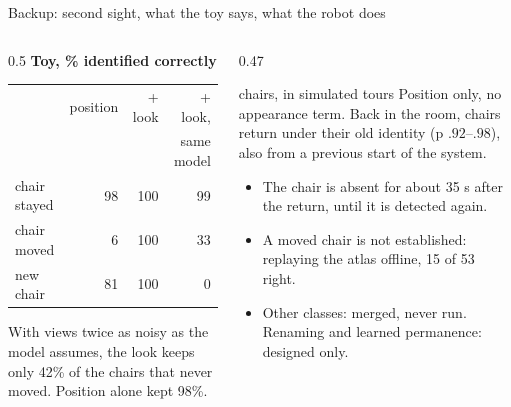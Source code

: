 \documentclass[10pt, aspectratio=169]{beamer}
\begin{document}
\begin{frame}{Backup: second sight, what the toy says, what the robot does \wip}
  \begin{columns}[T]
    \begin{column}{0.5\textwidth}
      \footnotesize
      \textbf{Toy, \% identified correctly}\\[0.3em]
      \begin{tabular}{@{}l r r r@{}}
        \toprule
         & position & + look & + look,\\
         & & & same model \\
        \midrule
        chair stayed & 98 & 100 & 99 \\
        chair moved & 6 & 100 & \alert{33} \\
        new chair & 81 & 100 & \alert{0} \\
        \bottomrule
      \end{tabular}

      \vspace{0.6em}
      With views twice as noisy as the model assumes, the look keeps only \alert{42\%} of the chairs
      that never moved. Position alone kept 98\%.
    \end{column}
    \begin{column}{0.47\textwidth}
      \begin{measured}{chairs, in simulated tours}\footnotesize
        Position only, no appearance term. Back in the room, chairs return under their old identity
        (p $.92$--$.98$), also from a previous start of the system.
      \end{measured}
      \footnotesize
      \begin{itemize}
        \item The chair is absent for about 35 s after the return, until it is detected again.
        \item A \alert{moved} chair is not established: replaying the atlas offline, 15 of 53 right.
        \item Other classes: merged, never run. Renaming and learned permanence: designed only.
      \end{itemize}
    \end{column}
  \end{columns}
\end{frame}
\end{document}
